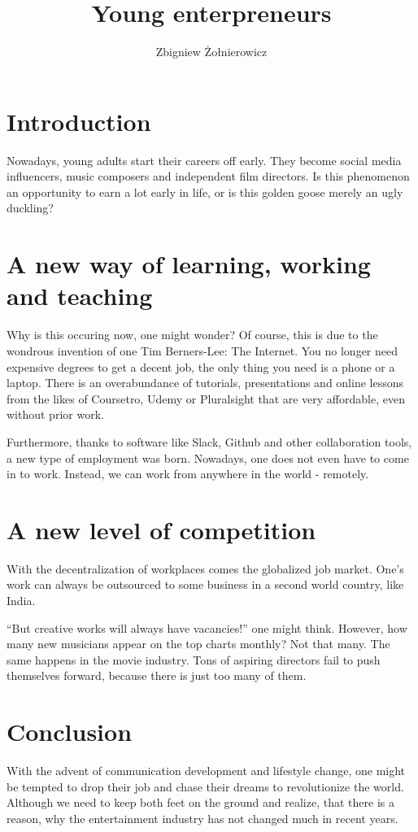 \documentclass[a4paper]{article}
\begin{document}
\title{Young enterpreneurs}
\author{Zbigniew Żołnierowicz}
\maketitle
\section{Introduction}
Nowadays, young adults start their careers off early. They become social media influencers, music composers and independent film directors. Is this phenomenon an opportunity to earn a lot early in life, or is this golden goose merely an ugly duckling?
\section{A new way of learning, working and teaching}
Why is this occuring now, one might wonder? Of course, this is due to the wondrous invention of one Tim Berners-Lee: The Internet. You no longer need expensive degrees to get a decent job, the only thing you need is a phone or a laptop. There is an overabundance of tutorials, presentations and online lessons from the likes of Coursetro, Udemy or Pluralsight that are very affordable, even without prior work.

Furthermore, thanks to software like Slack, Github and other collaboration tools, a new type of employment was born. Nowadays, one does not even have to come in to work. Instead, we can work from anywhere in the world - remotely.
\section{A new level of competition}
With the decentralization of workplaces comes the globalized job market. One's work can always be outsourced to some business in a second world country, like India.

``But creative works will always have vacancies!'' one might think. However, how many new musicians appear on the top charts monthly? Not that many. The same happens in the movie industry. Tons of aspiring directors fail to push themselves forward, because there is just too many of them.
\section{Conclusion}
With the advent of communication development and lifestyle change, one might be tempted to drop their job and chase their dreams to revolutionize the world. Although we need to keep both feet on the ground and realize, that there is a reason, why the entertainment industry has not changed much in recent years.
\end{document}
